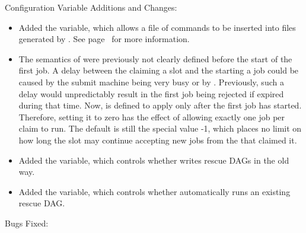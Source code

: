 \noindent Configuration Variable Additions and Changes:

\begin{itemize}

\item Added the  variable, which allows a file
  of commands to be inserted into  files generated
  by .  See page~\pageref{param:DAGManInsertSubFile}
  for more information.

\item The semantics of  were previously not
clearly defined before the start of the first job.  A delay between
the  claiming a slot and the  starting a
job could be caused by the submit machine being very busy or by
.  Previously, such a delay would
unpredictably result in the first job being rejected if
 expired during that time.  Now,
 is defined to apply only after the first job
has started.  Therefore, setting it to zero has the effect of allowing
exactly one job per claim to run.  The default is still the special
value -1, which places no limit on how long the slot may continue
accepting new jobs from the  that claimed it.

\item Added the  variable, which controls whether
 writes rescue DAGs in the old way.

\item Added the  variable, which controls
whether  automatically runs an existing rescue DAG.

\end{itemize}

\noindent Bugs Fixed:

